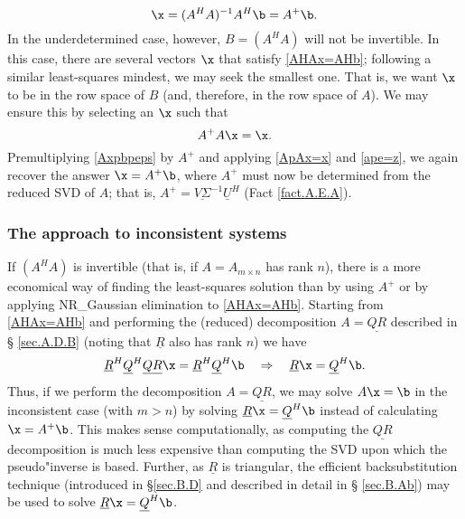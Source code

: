 \begin{equation}
\x=(A^{H} A)^{-1}A^{H}\b=A^{+}\b.
\label{Aplussol}
\end{equation}
In the underdetermined case, however, $B=(A^{H} A)$ will not be
invertible.  In this case, there are several vectors $\x$ that satisfy
\eqref{AHAx=AHb}; following a similar least-squares mindest, we may
seek the smallest one.  That is, we want $\x$ to be in the row space
of $B$ (and, therefore, in the row space of $A$).  We may ensure this
by selecting an $\x$ such that
\begin{equation}
A^{+} A\x=\x.
\label{ApAx=x}
\end{equation}
Premultiplying \eqref{Axpbpeps} by $A^{+}$ and applying \eqref{ApAx=x}
and \eqref{ape=z}, we again recover the answer $\x=A^{+}\b$, where
$A^{+}$ must now be determined from the reduced SVD of $A$; that is, $A^{+}=\underline{V \Sigma}^{-1} \underline{U}^{H}$ (Fact \ref{fact.A.E.A}).

\subsubsection{The  approach to inconsistent systems}\label{sec:QRinconsys}

If $(A^{H} A)$ is invertible (that is, if $A=A_{m\times n}$ has rank
$n$), there is a more economical way of finding the least-squares
solution than by using $A^{+}$ or by applying NR_Gaussian elimination to
\eqref{AHAx=AHb}.  Starting from \eqref{AHAx=AHb} and performing the
(reduced) decomposition $A=\underline{QR}$ described in \S
\ref{sec.A.D.B} (noting that $\underline{R}$ also has rank $n$) we
have
\begin{equation*}
    \underline{R}^{H} \underline{Q}^{H} \underline{Q R} \x = \underline{R}^{H} \underline{Q}^{H} \b \quad \Rightarrow \quad
    \underline{R}\x=\underline{Q}^{H} \b.
\end{equation*}
Thus, if we perform the decomposition $A=\underline{QR}$, we may solve
$A\x=\b$ in the inconsistent case (with $m>n$) by solving
$\underline{R}\x=\underline{Q}^{H} \b$ instead of calculating
$\x=A^{+}\b$.  This makes sense computationally, as computing
the $\underline{QR}$ decomposition is much less expensive than
computing the SVD upon which the pseudo"inverse is based.  Further, as
$\underline{R}$ is triangular, the efficient backsubstitution
technique (introduced in \S \ref{sec.B.D} and described in detail in \S
\ref{sec.B.Ab}) may be used to solve $\underline{R}\x=\underline{Q}^{H}
\b$.

